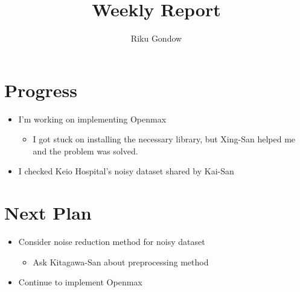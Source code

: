 \documentclass[dvipdfmx]{article}
\begin{document}
\title{Weekly Report}
\author{Riku Gondow}
\maketitle
\section{Progress}
\begin{itemize}
	\item I'm working on implementing Openmax
	\begin{itemize}
		\item I got stuck on installing the necessary library, but Xing-San helped me and the problem was solved.
	\end{itemize}
	\item I checked Keio Hospital's noisy dataset shared by Kai-San
\end{itemize}
\section{Next Plan}
\begin{itemize}
	\item Consider noise reduction method for noisy dataset
	\begin{itemize}
		\item Ask Kitagawa-San about preprocessing method
	\end{itemize}
	\item Continue to implement Openmax
\end{itemize}
\end{document}
